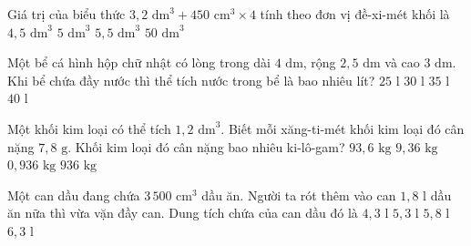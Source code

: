 \begin{ex} %
Giá trị của biểu thức $3{,}2\text{ dm}^3 + 450\text{ cm}^3 \times 4$ tính theo đơn vị đề-xi-mét khối là
\choice
{$4{,}5\text{ dm}^3$}
{\True $5\text{ dm}^3$}
{$5{,}5\text{ dm}^3$}
{$50\text{ dm}^3$}
\end{ex}

\begin{ex} %
Một bể cá hình hộp chữ nhật có lòng trong dài $4\text{ dm}$, rộng $2{,}5\text{ dm}$ và cao $3\text{ dm}$. Khi bể chứa đầy nước thì thể tích nước trong bể là bao nhiêu lít?
\choice
{$25\text{ l}$}
{\True $30\text{ l}$}
{$35\text{ l}$}
{$40\text{ l}$}
\end{ex}

\begin{ex} %
Một khối kim loại có thể tích $1{,}2\text{ dm}^3$. Biết mỗi xăng-ti-mét khối kim loại đó cân nặng $7{,}8\text{ g}$. Khối kim loại đó cân nặng bao nhiêu ki-lô-gam?
\choice
{$93{,}6\text{ kg}$}
{\True $9{,}36\text{ kg}$}
{$0{,}936\text{ kg}$}
{$936\text{ kg}$}
\end{ex}

\begin{ex} %
Một can dầu đang chứa $3\,500\text{ cm}^3$ dầu ăn. Người ta rót thêm vào can $1{,}8\text{ l}$ dầu ăn nữa thì vừa vặn đầy can. Dung tích chứa của can dầu đó là
\choice
{$4{,}3\text{ l}$}
{\True $5{,}3\text{ l}$}
{$5{,}8\text{ l}$}
{$6{,}3\text{ l}$}
\end{ex}

